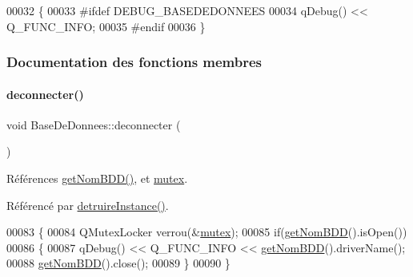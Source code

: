 \begin{DoxyCode}
00032 \{
00033 \textcolor{preprocessor}{    #ifdef DEBUG\_BASEDEDONNEES}
00034     qDebug() << Q\_FUNC\_INFO;
00035 \textcolor{preprocessor}{    #endif}
00036 \}
\end{DoxyCode}


\subsubsection{Documentation des fonctions membres}
\mbox{\label{class_base_de_donnees_ae780999d25a26a0e4dbe0706a4785978}} 
\paragraph{\texorpdfstring{deconnecter()}{deconnecter()}}
{\footnotesize\ttfamily void Base\+De\+Donnees\+::deconnecter (\begin{DoxyParamCaption}{ }\end{DoxyParamCaption})}



Références \hyperlink{class_base_de_donnees_a467909531ae3cdebaf173f6e97cdc624}{get\+Nom\+B\+D\+D()}, et \hyperlink{class_base_de_donnees_aa1b4696fac87a740f914aa73739086f2}{mutex}.



Référencé par \hyperlink{class_base_de_donnees_a457401c0816b888c77ce915997545f4e}{detruire\+Instance()}.


\begin{DoxyCode}
00083 \{
00084     QMutexLocker verrou(&\hyperlink{class_base_de_donnees_aa1b4696fac87a740f914aa73739086f2}{mutex});
00085     \textcolor{keywordflow}{if}(\hyperlink{class_base_de_donnees_a467909531ae3cdebaf173f6e97cdc624}{getNomBDD}().isOpen())
00086     \{
00087         qDebug() << Q\_FUNC\_INFO << \hyperlink{class_base_de_donnees_a467909531ae3cdebaf173f6e97cdc624}{getNomBDD}().driverName();
00088         \hyperlink{class_base_de_donnees_a467909531ae3cdebaf173f6e97cdc624}{getNomBDD}().close();
00089     \}
00090 \}
\end{DoxyCode}
\mbox{\label{class_base_de_donnees_a457401c0816b888c77ce915997545f4e}} 
